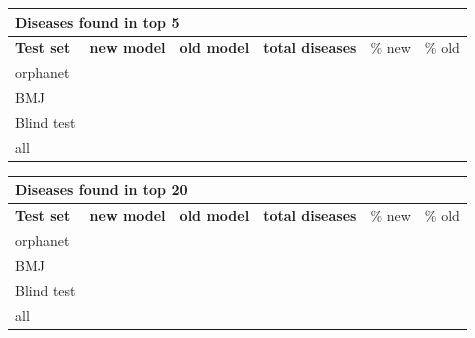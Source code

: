 \documentclass[10pt,letterpaper,final]{article}
\begin{document}
\begin{center}
\begin{small}
\begin{tabular}{l|cc||ccc}
	\multicolumn{6}{l}{\textbf{Diseases found in top 5}} \\ \hline
\textbf{Test set} & \textbf{new model} &	\textbf{old model}	 &	\textbf{total diseases} &	\% new	 &\% old \\ \hline
orphanet    &       &      &       &      & \\
BMJ	        &       &      &       &      & \\
Blind test	&       &      &       &      & \\ \hline \hline
all	        &       &      &       &      & \\ \hline
\end{tabular}
\end{small}
\end{center}

\begin{center}
\begin{small}
\begin{tabular}{l|cc||ccc}
	\multicolumn{6}{l}{\textbf{Diseases found in top 20}} \\ \hline
\textbf{Test set} & \textbf{new model} &	\textbf{old model}	 &	\textbf{total diseases} &	\% new	 &\% old \\ \hline
orphanet    &       &      &       &      & \\
BMJ	        &       &      &       &      & \\
Blind test	&       &      &       &      & \\ \hline \hline
all	        &       &      &       &      & \\ \hline
\end{tabular}
\end{small}
\end{center}
\end{document}

